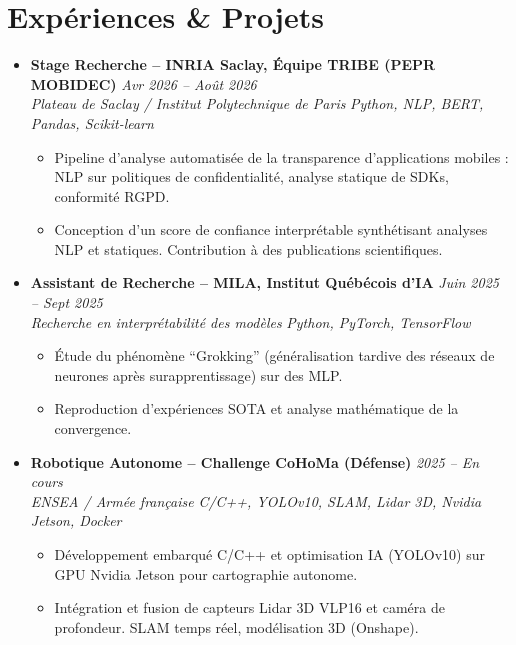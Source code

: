 \documentclass[a4paper,11pt]{article}
\begin{document}
\section{Expériences \& Projets}
\begin{itemize}[leftmargin=*, label={-}]

\item \textbf{Stage Recherche -- INRIA Saclay, Équipe TRIBE (PEPR MOBIDEC)} \hfill \textit{Avr 2026 -- Août 2026} \\
\textit{Plateau de Saclay / Institut Polytechnique de Paris} \hfill \textit{Python, NLP, BERT, Pandas, Scikit-learn}
\vspace{-2pt}
    \begin{itemize}[leftmargin=0.4cm, nosep, label=\tiny$\bullet$]
        \item \small{Pipeline d'analyse automatisée de la transparence d'applications mobiles : NLP sur politiques de confidentialité, analyse statique de SDKs, conformité RGPD.}
        \item \small{Conception d'un score de confiance interprétable synthétisant analyses NLP et statiques. Contribution à des publications scientifiques.}
    \end{itemize}
\vspace{3pt}

\item \textbf{Assistant de Recherche -- MILA, Institut Québécois d'IA} \hfill \textit{Juin 2025 -- Sept 2025} \\
\textit{Recherche en interprétabilité des modèles} \hfill \textit{Python, PyTorch, TensorFlow}
\vspace{-2pt}
    \begin{itemize}[leftmargin=0.4cm, nosep, label=\tiny$\bullet$]
        \item \small{Étude du phénomène ``Grokking'' (généralisation tardive des réseaux de neurones après surapprentissage) sur des MLP.}
        \item \small{Reproduction d'expériences SOTA et analyse mathématique de la convergence.}
    \end{itemize}
\vspace{3pt}

\item \textbf{Robotique Autonome -- Challenge CoHoMa (Défense)} \hfill \textit{2025 -- En cours} \\
\textit{ENSEA / Armée française} \hfill \textit{C/C++, YOLOv10, SLAM, Lidar 3D, Nvidia Jetson, Docker}
\vspace{-2pt}
    \begin{itemize}[leftmargin=0.4cm, nosep, label=\tiny$\bullet$]
        \item \small{Développement embarqué C/C++ et optimisation IA (YOLOv10) sur GPU Nvidia Jetson pour cartographie autonome.}
        \item \small{Intégration et fusion de capteurs Lidar 3D VLP16 et caméra de profondeur. SLAM temps réel, modélisation 3D (Onshape).}
    \end{itemize}
\vspace{3pt}


\end{itemize}
\end{document}
